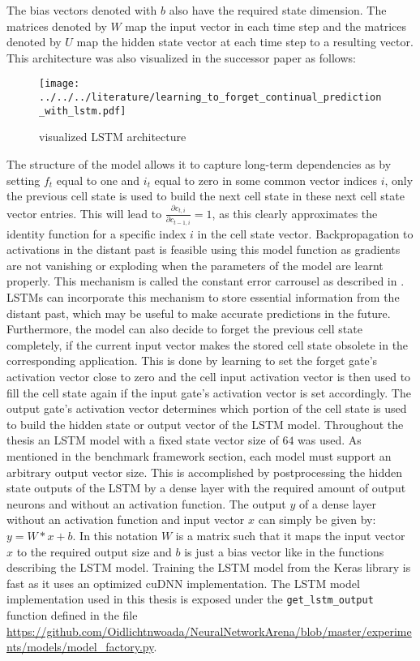 \documentclass[draft,final]{vutinfth} %
\begin{document}
    The bias vectors denoted with $b$ also have the required state dimension.
    The matrices denoted by $W$ map the input vector in each time step and the matrices denoted by $U$ map the hidden state vector at each time step to a resulting vector.
    This architecture was also visualized in the successor paper as follows:
    \begin{figure}[H]
        \centering{}
        \texttt{[image: ../../../literature/learning\_to\_forget\_continual\_prediction\_with\_lstm.pdf]}
        \caption{visualized LSTM architecture \cite[p. 6]{LSTM_forget}}
        \label{fig:lstm_vis}
    \end{figure}
    The structure of the model allows it to capture long-term dependencies as by setting $f_t$ equal to one and $i_t$ equal to zero in some common vector indices $i$, only the previous cell state is used to build the next cell state in these next cell state vector entries.
    This will lead to $\frac{\partial{c_{t,i}}}{\partial{c_{t-1,i}}} = 1$, as this clearly approximates the identity function for a specific index $i$ in the cell state vector.
    Backpropagation to activations in the distant past is feasible using this model function as gradients are not vanishing or exploding when the parameters of the model are learnt properly.
    This mechanism is called the constant error carrousel as described in \cite[p. 7]{LSTM}.
    LSTMs can incorporate this mechanism to store essential information from the distant past, which may be useful to make accurate predictions in the future.
    Furthermore, the model can also decide to forget the previous cell state completely, if the current input vector makes the stored cell state obsolete in the corresponding application.
    This is done by learning to set the forget gate's activation vector close to zero and the cell input activation vector is then used to fill the cell state again if the input gate's activation vector is set accordingly.
    The output gate's activation vector determines which portion of the cell state is used to build the hidden state or output vector of the LSTM model. 
    Throughout the thesis an LSTM model with a fixed state vector size of $64$ was used. As mentioned in the benchmark framework section, each model must support an arbitrary output vector size.
    This is accomplished by postprocessing the hidden state outputs of the LSTM by a dense layer with the required amount of output neurons and without an activation function.
    The output $y$ of a dense layer without an activation function and input vector $x$ can simply be given by: $y = W*x + b$.
    In this notation $W$ is a matrix such that it maps the input vector $x$ to the required output size and $b$ is just a bias vector like in the functions describing the LSTM model.
    Training the LSTM model from the Keras library is fast as it uses an optimized cuDNN \cite{cuDNN} implementation.
    The LSTM model implementation used in this thesis is exposed under the \texttt{get\_lstm\_output} function defined in the file \url{https://github.com/Oidlichtnwoada/NeuralNetworkArena/blob/master/experiments/models/model_factory.py}.
\end{document}
